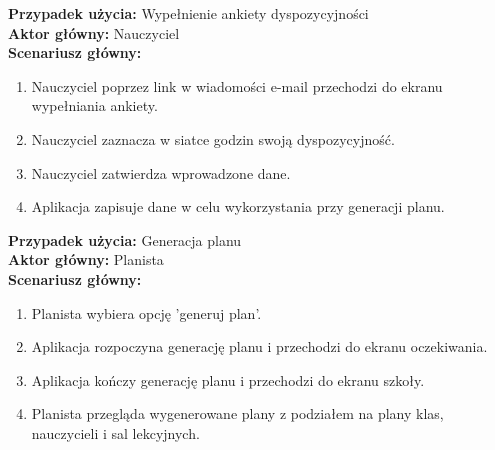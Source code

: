 \noindent
\textbf{Przypadek użycia:} Wypełnienie ankiety dyspozycyjności\\
\textbf{Aktor główny:} Nauczyciel\\
\textbf{Scenariusz główny:}
\begin{enumerate}
	\item Nauczyciel poprzez link w wiadomości e-mail przechodzi do ekranu wypełniania ankiety.
	\item Nauczyciel zaznacza w siatce godzin swoją dyspozycyjność.
	\item Nauczyciel zatwierdza wprowadzone dane.
	\item Aplikacja zapisuje dane w celu wykorzystania przy generacji planu.
\end{enumerate}

\noindent
\textbf{Przypadek użycia:} Generacja planu\\
\textbf{Aktor główny:} Planista\\
\textbf{Scenariusz główny:}
\begin{enumerate}
	\item Planista wybiera opcję 'generuj plan'.
	\item Aplikacja rozpoczyna generację planu i przechodzi do ekranu oczekiwania.
	\item Aplikacja kończy generację planu i przechodzi do ekranu szkoły.
	\item Planista przegląda wygenerowane plany z podziałem na plany klas, nauczycieli i sal lekcyjnych.
\end{enumerate}